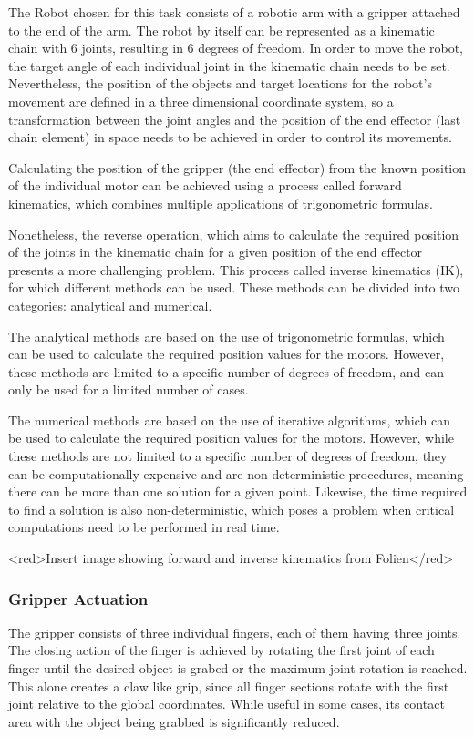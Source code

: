 The Robot chosen for this task consists of a robotic arm with a gripper attached to the end of the arm. The robot by itself can be represented as a kinematic chain with 6 joints, resulting in 6 degrees of freedom.
In order to move the robot, the target angle of each individual joint in the kinematic chain needs to be set. Nevertheless, the position of the objects and target locations for the robot's movement are defined in a three dimensional coordinate system, so a transformation between the joint angles and the position of the end effector (last chain element) in space needs to be achieved in order to control its movements.

Calculating the position of the gripper (the end effector) from the known position of the individual motor can be achieved using a process called forward kinematics, which combines multiple applications of trigonometric formulas.

Nonetheless, the reverse operation, which aims to calculate the required position of the joints in the kinematic chain for a given position of the end effector presents a more challenging problem. 
This process called inverse kinematics (IK), for which different methods can be used. These methods can be divided into two categories: analytical and numerical.

The analytical methods are based on the use of trigonometric formulas, which can be used to calculate the required position values for the motors. However, these methods are limited to a specific number of degrees of freedom, and can only be used for a limited number of cases.

The numerical methods are based on the use of iterative algorithms, which can be used to calculate the required position values for the motors. However, while these methods are not limited to a specific number of degrees of freedom, they can be computationally expensive and are non-deterministic procedures, meaning there can be more than one solution for a given point. Likewise, the time required to find a solution is also non-deterministic, which poses a problem when critical computations need to be performed in real time.

<red>Insert image showing forward and inverse kinematics from Folien</red>


\subsubsection{Gripper Actuation}

The gripper consists of three individual fingers, each of them having three joints. The closing action of the finger is achieved by rotating the first joint of each finger until the desired object is grabed or the maximum joint rotation is reached. This alone creates a claw like grip, since all finger sections rotate with the first joint relative to the global coordinates. While useful in some cases, its contact area with the object being grabbed is significantly reduced.

